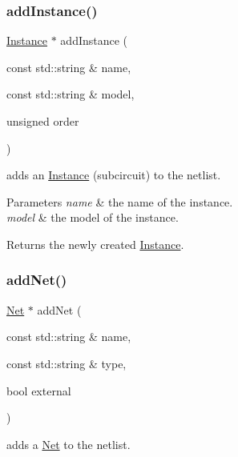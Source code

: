 \subsubsection{\texorpdfstring{add\+Instance()}{addInstance()}}
{\footnotesize\ttfamily \hyperlink{class_open_chams_1_1_instance}{Instance} $\ast$ add\+Instance (\begin{DoxyParamCaption}\item[{const std\+::string \&}]{name,  }\item[{const std\+::string \&}]{model,  }\item[{unsigned}]{order }\end{DoxyParamCaption})}



adds an \hyperlink{class_open_chams_1_1_instance}{Instance} (subcircuit) to the netlist. 


\begin{DoxyParams}{Parameters}
{\em name} & the name of the instance. \\
\hline
{\em model} & the model of the instance.\\
\hline
\end{DoxyParams}
\begin{DoxyReturn}{Returns}
the newly created \hyperlink{class_open_chams_1_1_instance}{Instance}. 
\end{DoxyReturn}
\mbox{\label{class_open_chams_1_1_netlist_a52be455a704925328843770552eca43d}} 
\subsubsection{\texorpdfstring{add\+Net()}{addNet()}}
{\footnotesize\ttfamily \hyperlink{class_open_chams_1_1_net}{Net} $\ast$ add\+Net (\begin{DoxyParamCaption}\item[{const std\+::string \&}]{name,  }\item[{const std\+::string \&}]{type,  }\item[{bool}]{external }\end{DoxyParamCaption})}



adds a \hyperlink{class_open_chams_1_1_net}{Net} to the netlist. 


